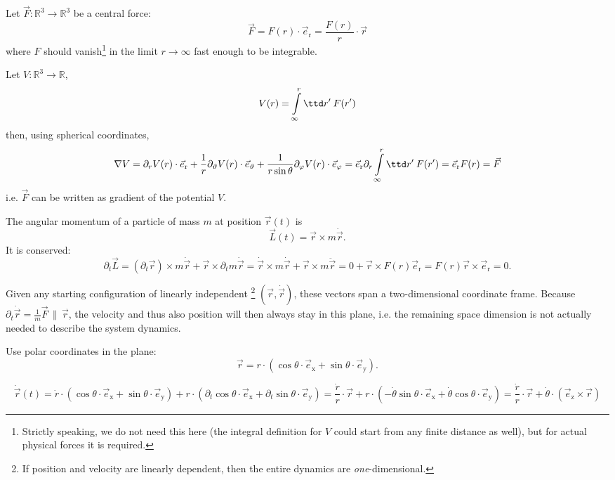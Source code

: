 
\newcommand{\unitV}[1]{{\vec{e}_{\mathrm{#1}}}}
\newcommand{\posr}{\vec{r}}
\newcommand{\Force}{\vec{F}}
\newcommand{\AngMom}{\vec{L}}
\newcommand{\mom}{\vec{p}}


Let $\Force : \mathbb{R}^3\to\mathbb{R}^3$ be a central force:
\[
  \Force = F(r)\cdot \unitV{r}
         = \frac{F(r)}{r}\cdot \posr
\]
where $F$ should vanish\footnote{%
Strictly speaking, we do not need this here (the integral definition for $V$ could start from any finite distance as well), but for actual physical forces it is required.
} in the limit $r\to\infty$ fast enough to be integrable.

\subex{}
Let $V : \mathbb{R}^3\to\mathbb{R}$,
\[
  V(r) = \int\limits^r_\infty\ttd r'\: F(r')
\]
then, using spherical coordinates,
\[
  \nabla V
   = \partial_r V(r) \cdot \unitV{r}
    + \frac1r \partial_\vartheta V(r) \cdot \unitV{\vartheta}
    + \frac1{r\sin\theta} \partial_\varphi V(r) \cdot \unitV{\varphi}
   = \unitV{r} \partial_r\int\limits^r_\infty\ttd r'\: F(r')
   = \unitV{r} F(r)
   = \Force
\]
i.e. $\Force$ can be written as gradient of the potential $V$.

\subex{}
The angular momentum of a particle of mass $m$ at position $\posr(t)$ is
\[
  \AngMom(t) = \posr \times m\dot\posr.
\]
It is conserved:
\[
  \partial_t \AngMom
     = (\partial_t\posr) \times m\dot\posr
       + \posr \times \partial_t m\dot\posr
     = \dot\posr \times m\dot\posr
       + \posr \times m\ddot\posr
     = 0 + \posr \times F(r)\unitV{r}
     =  F(r) \posr \times\unitV{r}
     = 0.
\]



\subex{}
Given any starting configuration of linearly independent%
\footnote{If position and velocity are linearly dependent, then the entire dynamics are \emph{one}-dimensional.}
$(\posr, \dot\posr)$, these vectors span a two-dimensional coordinate frame. Because $\partial_t \dot\posr = \tfrac1m \Force \,\|\, \posr$, the velocity and thus also position will then always stay in this plane, i.e. the remaining space dimension is not actually needed to describe the system dynamics.

Use polar coordinates in the plane:
\[
  \posr = r\cdot (\cos\theta\cdot \unitV{x} + \sin\theta \cdot \unitV{y}).
\]

\subex{}
\[
  \dot\posr(t)
     = \dot r \cdot (\cos\theta\cdot \unitV{x} + \sin\theta \cdot \unitV{y})
      + r \cdot (\partial_t \cos\theta\cdot \unitV{x} + \partial_t\sin\theta \cdot \unitV{y})
     = \frac{\dot r}{r} \cdot \posr
      + r \cdot (-\dot\theta\sin\theta\cdot \unitV{x} + \dot\theta \cos\theta \cdot \unitV{y})
     = \frac{\dot r}{r} \cdot \posr
      + \dot\theta \cdot (\unitV{z}\times\posr)
\]

